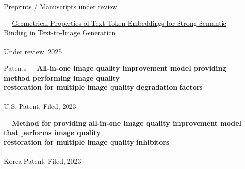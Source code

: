 \documentclass{resume} %
\begin{document}
\begin{rSection}{Preprints / Manuscripts under review}


\textbullet~\,\, \href{https://arxiv.org/pdf/2503.23011}{Geometrical Properties of Text Token Embeddings for Strong Semantic Binding in Text-to-Image Generation}
\\ 
\\ \hspace*{1.5em}Under review, 2025

\end{rSection}

\begin{rSection}{Patents}
\textbullet~\,\, \textbf{All-in-one image quality improvement model providing method performing image quality \\\hspace*{1.4em}restoration for multiple image quality degradation factors}
\\ 
\\ \hspace*{1.5em}U.S. Patent, Filed, 2023


\textbullet~\,\, \textbf{Method for providing all-in-one image quality improvement model that performs image quality \\\hspace*{1.4em}restoration for multiple image quality inhibitors}
\\ 
\\ \hspace*{1.5em}Korea Patent, Filed, 2023 \\
\end{rSection}
\end{document}
